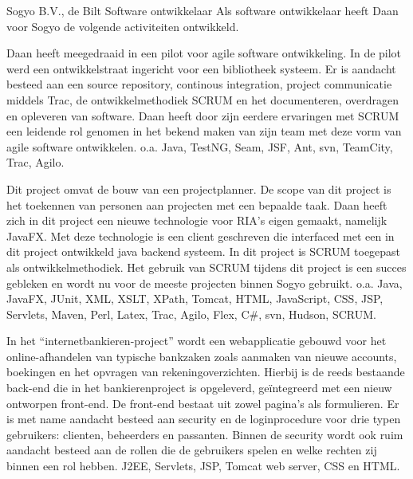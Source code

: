 	\begin{workExperience}{Sogyo B.V., de Bilt}%
	{Software ontwikkelaar}{}
		Als software ontwikkelaar heeft Daan voor Sogyo de volgende
		activiteiten ontwikkeld.
		
		Daan heeft meegedraaid in een pilot voor agile software ontwikkeling. In
		de pilot werd een ontwikkelstraat ingericht voor een bibliotheek
		systeem. Er is aandacht besteed aan	een source repository, continous
		integration, project communicatie middels Trac, de ontwikkelmethodiek
		SCRUM en het documenteren, overdragen en opleveren van software.
		Daan heeft door zijn eerdere ervaringen met SCRUM een leidende rol
		genomen in het bekend maken van zijn team met deze vorm van agile
		software ontwikkelen.
		\technics o.a. Java, TestNG, Seam, JSF, Ant, svn, TeamCity, Trac, Agilo.
		
		Dit project omvat de bouw van een projectplanner. De scope van dit
		project is het toekennen van personen aan projecten met een bepaalde
		taak. Daan heeft zich in dit project een nieuwe technologie voor RIA's
		eigen gemaakt, namelijk JavaFX. Met deze technologie is een client
		geschreven die interfaced met een in dit project ontwikkeld java backend
		systeem. In dit project is SCRUM toegepast als ontwikkelmethodiek. Het
		gebruik van SCRUM tijdens dit project is een succes gebleken en wordt nu
		voor de meeste projecten binnen Sogyo gebruikt.
		\technics o.a. Java, JavaFX, JUnit, XML, XSLT, XPath, Tomcat, HTML,
		JavaScript, CSS, JSP, Servlets, Maven, Perl, Latex, Trac, Agilo, Flex,
		C\#, svn, Hudson, SCRUM.

		In het ``internetbankieren-project'' wordt een webapplicatie gebouwd voor
		het online-afhandelen van typische bankzaken zoals aanmaken van nieuwe
		accounts, boekingen en het opvragen van rekeningoverzichten. Hierbij is
		de reeds bestaande back-end die in het bankierenproject is opgeleverd,
		ge\"integreerd met een nieuw ontworpen front-end. De front-end bestaat uit
		zowel pagina's als formulieren. Er is met name aandacht besteed aan
		security en de loginprocedure voor drie typen gebruikers: clienten,
		beheerders en passanten. Binnen de security wordt ook ruim aandacht
		besteed aan de rollen die de gebruikers spelen en welke rechten zij
		binnen een rol hebben.
		\technics J2EE, Servlets, JSP, Tomcat web server, CSS en HTML.
		

\end{workExperience}
